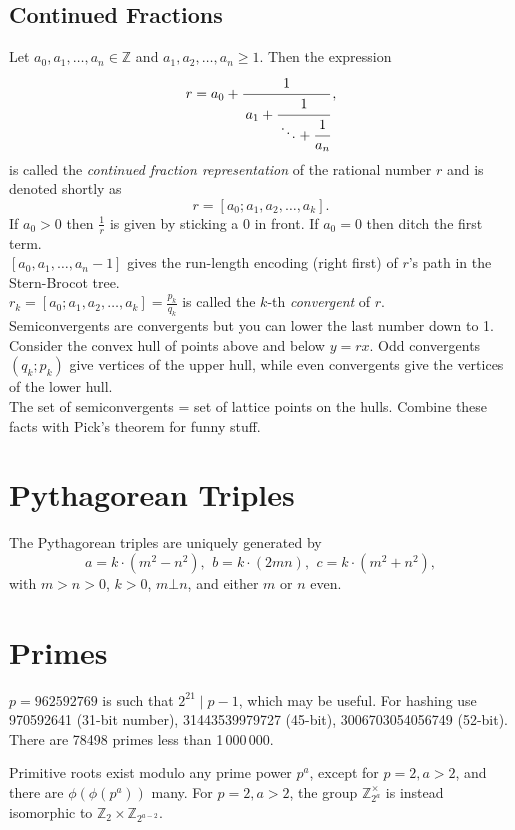 	\subsection{Continued Fractions}
	Let $a_0,a_1,\ldots,a_n\in\mathbb{Z}$ and $a_1,a_2,\ldots,a_n\ge 1$. Then the expression
	\[ r = a_0 + \cfrac{1}{\,a_1 + \cfrac{1}{\,\ddots + \cfrac{1}{a_n}}}\,, \]
	is called the \emph{continued fraction representation} of the rational number $r$
	and is denoted shortly as
	\[ r = [a_0; a_1, a_2, \ldots, a_k]. \]
	If $a_0 > 0$ then $\frac{1}{r}$ is given by sticking a $0$ in front. If $a_0 = 0$ then ditch the first term. \\ 
	$[a_0, a_1, \dots, a_n - 1]$ gives the run-length encoding (right first) of $r$'s path in the Stern-Brocot tree. \\ 
	$r_k = [a_0; a_1, a_2, \dots, a_k] = \frac{p_k}{q_k}$ is called the $k$-th \emph{convergent} of $r$. \\
	Semiconvergents are convergents but you can lower the last number down to 1. \\
	Consider the convex hull of points above and below $y = rx$. Odd convergents $(q_k; p_k)$ give vertices of the upper hull, while even convergents give the vertices of the lower hull. \\
	The set of semiconvergents = set of lattice points on the hulls. Combine these facts with Pick's theorem for funny stuff. \\


\section{Pythagorean Triples}
 The Pythagorean triples are uniquely generated by
 \[ a=k\cdot (m^{2}-n^{2}),\ \,b=k\cdot (2mn),\ \,c=k\cdot (m^{2}+n^{2}), \]
 with $m > n > 0$, $k > 0$, $m \bot n$, and either $m$ or $n$ even.

\section{Primes}
	$p=962592769$ is such that $2^{21} \mid p-1$, which may be useful. For hashing
	use 970592641 (31-bit number), 31443539979727 (45-bit), 3006703054056749
	(52-bit). There are 78498 primes less than 1\,000\,000.

	Primitive roots exist modulo any prime power $p^a$, except for $p = 2, a > 2$, and there are $\phi(\phi(p^a))$ many.
	For $p = 2, a > 2$, the group $\mathbb Z_{2^a}^\times$ is instead isomorphic to $\mathbb Z_2 \times \mathbb Z_{2^{a-2}}$.

